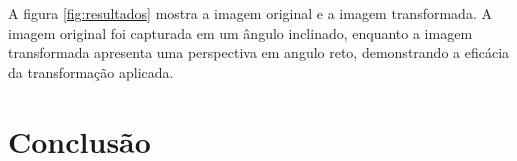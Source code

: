 \documentclass[sigconf,nonacm]{acmart}
\begin{document}
A figura \ref{fig:resultados} mostra a imagem original e a imagem transformada. A imagem original foi capturada em um ângulo inclinado, enquanto a imagem transformada apresenta uma perspectiva em angulo reto, demonstrando a eficácia da transformação aplicada.




\section{Conclusão}



\end{document}
